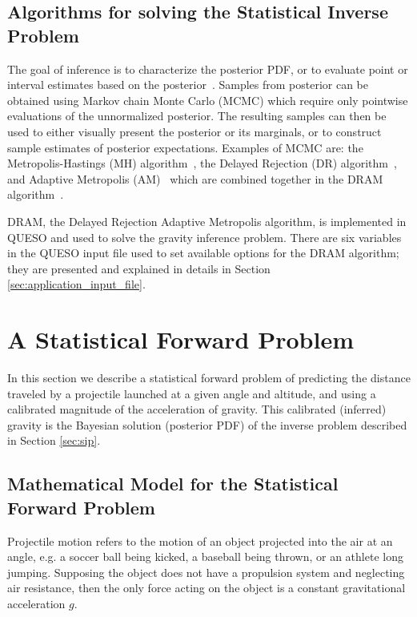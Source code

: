 \subsection{Algorithms for solving the Statistical Inverse Problem}
The goal of inference is to characterize the posterior PDF, or to evaluate point or interval estimates based on the posterior~\cite{HuMa01}.
Samples from posterior can be obtained using Markov chain Monte Carlo (MCMC) which require only pointwise evaluations of the unnormalized posterior.
The resulting samples can then be used to either visually present the posterior or its marginals, or to construct sample estimates of posterior expectations.
Examples of MCMC are: the Metropolis-Hastings (MH) algorithm~\cite{Metr_1953,Hast_1970}, the Delayed Rejection (DR) algorithm~\cite{GrMi01,Mira01}, and
Adaptive Metropolis (AM)~\cite{HaSaTa01} which are combined together in the DRAM algorithm~\cite{HaLaMiSa06}.

DRAM, the Delayed Rejection Adaptive Metropolis algorithm,  is  implemented in QUESO and used to solve
the gravity inference problem. There are six variables in the QUESO input file used to set available options for the DRAM algorithm; they are presented and explained in details in Section \ref{sec:application_input_file}.




\section{A Statistical Forward Problem}\label{sec:sfp}


In this section we describe a statistical forward problem  of predicting the distance traveled by a projectile launched at a given angle and altitude, and using a calibrated magnitude of the acceleration of gravity.  This calibrated (inferred) gravity is the Bayesian solution (posterior PDF) of the inverse problem described in Section \ref{sec:sip}.


\subsection{Mathematical Model for the Statistical Forward Problem}


Projectile motion refers to the motion of an object projected into the air at an angle, e.g. a soccer ball being kicked, a baseball being thrown, or an athlete long jumping. Supposing the object does not have a propulsion system and neglecting air resistance, then the only force acting on the object is a constant gravitational acceleration $g$.


